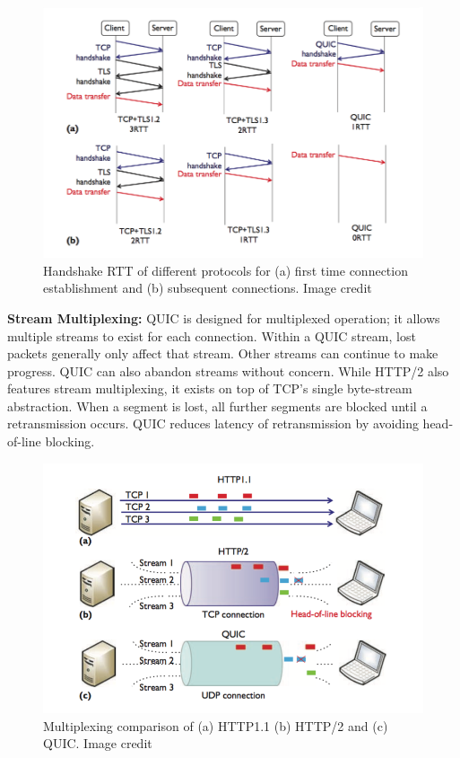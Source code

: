 \documentclass[12pt]{article}
\begin{document}
\begin{figure}
\centering
\includegraphics[scale=.3]{images/QUIC_TCP_RTT.png}
\caption{Handshake RTT of different protocols for (a) first time connection establishment and (b) subsequent connections. Image credit \cite{7867726}}
\label{fig:RTT}
\end{figure}

\textbf{Stream Multiplexing:} QUIC is designed for multiplexed operation; it allows multiple streams to exist for each connection. Within a QUIC stream, lost packets generally only affect that stream. Other streams can continue to make progress. QUIC can also abandon streams without concern. While HTTP/2 also features stream multiplexing, it exists on top of TCP's single byte-stream abstraction. When a segment is lost, all further segments are blocked until a retransmission occurs. QUIC reduces latency of retransmission by avoiding head-of-line blocking\cite{quicLayout}.

\begin{figure}
\centering
\includegraphics[scale=.4]{images/QUICmulti.png}
\caption{Multiplexing comparison of (a) HTTP1.1 (b) HTTP/2 and (c) QUIC. Image credit \cite{7867726}}
\label{fig:multiplex}
\end{figure}
\end{document}
